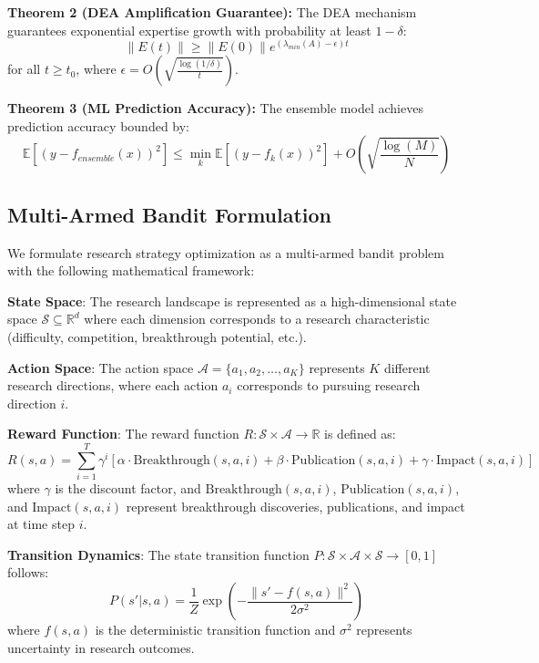 \documentclass[letterpaper]{article} %
\begin{document}
\textbf{Theorem 2 (DEA Amplification Guarantee):} The DEA mechanism guarantees exponential expertise growth with probability at least $1-\delta$:
\begin{equation}
\|E(t)\| \geq \|E(0)\| e^{(\lambda_{min}(A) - \epsilon)t}
\end{equation}
for all $t \geq t_0$, where $\epsilon = O\left(\sqrt{\frac{\log(1/\delta)}{t}}\right)$.

\textbf{Theorem 3 (ML Prediction Accuracy):} The ensemble model achieves prediction accuracy bounded by:
\begin{equation}
\mathbb{E}[(y - f_{ensemble}(x))^2] \leq \min_{k} \mathbb{E}[(y - f_k(x))^2] + O\left(\sqrt{\frac{\log(M)}{N}}\right)
\end{equation}

\subsection{Multi-Armed Bandit Formulation}

We formulate research strategy optimization as a multi-armed bandit problem with the following mathematical framework:

\textbf{State Space}: The research landscape is represented as a high-dimensional state space $\mathcal{S} \subseteq \mathbb{R}^d$ where each dimension corresponds to a research characteristic (difficulty, competition, breakthrough potential, etc.).

\textbf{Action Space}: The action space $\mathcal{A} = \{a_1, a_2, \ldots, a_K\}$ represents $K$ different research directions, where each action $a_i$ corresponds to pursuing research direction $i$.

\textbf{Reward Function}: The reward function $R: \mathcal{S} \times \mathcal{A} \rightarrow \mathbb{R}$ is defined as:
\begin{equation}
R(s, a) = \sum_{i=1}^{T} \gamma^i \left[\alpha \cdot \text{Breakthrough}(s, a, i) + \beta \cdot \text{Publication}(s, a, i) + \gamma \cdot \text{Impact}(s, a, i)\right]
\end{equation}
where $\gamma$ is the discount factor, and $\text{Breakthrough}(s, a, i)$, $\text{Publication}(s, a, i)$, and $\text{Impact}(s, a, i)$ represent breakthrough discoveries, publications, and impact at time step $i$.

\textbf{Transition Dynamics}: The state transition function $P: \mathcal{S} \times \mathcal{A} \times \mathcal{S} \rightarrow [0,1]$ follows:
\begin{equation}
P(s'|s, a) = \frac{1}{Z} \exp\left(-\frac{\|s' - f(s, a)\|^2}{2\sigma^2}\right)
\end{equation}
where $f(s, a)$ is the deterministic transition function and $\sigma^2$ represents uncertainty in research outcomes.
\end{document}
